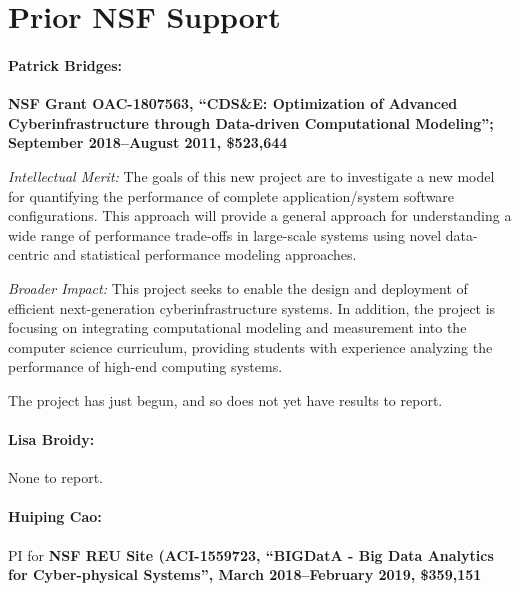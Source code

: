 \section{Prior NSF Support}
\label{sec:prior}

\paragraph{Patrick Bridges:}
\textbf{NSF Grant OAC-1807563, ``CDS\&E: Optimization of Advanced Cyberinfrastructure through Data-driven Computational Modeling''; September 2018--August 2011, \$523,644}

\noindent\textit{Intellectual Merit:} The goals of this new project are to investigate a new model for quantifying the performance of complete application/system software configurations. This approach will provide a general approach for understanding a wide range of performance trade-offs in large-scale systems using novel data-centric and statistical performance modeling approaches.

\noindent\textit{Broader Impact:} This project seeks to enable the design and deployment of efficient next-generation cyberinfrastructure systems. In addition, the project is focusing on integrating computational modeling and measurement into the computer science curriculum, providing students with experience analyzing the performance of high-end computing systems. 

\noindent The project has just begun, and so does not yet have results to report.

\paragraph{Lisa Broidy:} None to report.

\paragraph{Huiping Cao:} 
PI for {\bf NSF REU Site (ACI-1559723, ``BIGDatA - Big Data Analytics for Cyber-physical Systems'', %
March 2018--February 2019, \$359,151  } 


